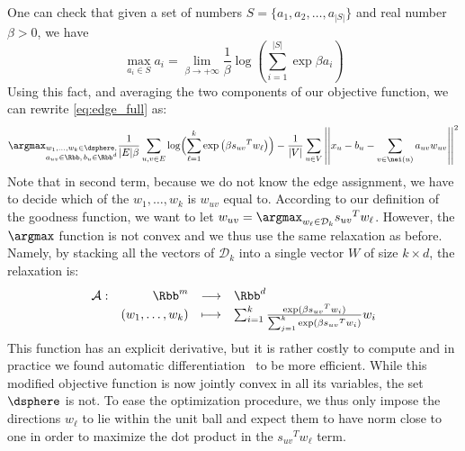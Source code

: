One can check that given a set of numbers $S=\{a_1, a_2, \ldots, a_{|S|}\}$ and real number $\beta >
0$, we have
\begin{equation*}
  \max_{a_i \in S} a_i = \lim_{\beta \rightarrow + \infty} \frac{1}{\beta}
  \log\left( \sum_{i=1}^{|S|} \exp{\beta a_i} \right)
\end{equation*}
Using this fact, and averaging the two components of our objective function, we can rewrite
\eqref{eq:edge_full} as:
\begin{equation}
  \label{eq:edge_soft}
  \argmax_{{\substack{w_1,\ldots,w_k \in \dsphere,\\
  a_{uv}\in\Rbb,\, b_u \in \Rbb^d}}}
  \frac{1}{|E|\beta} \sum_{u,v\in E}
  \log\Bigl(\sum_{\ell=1}^k\exp\left(\beta {s_{uv}}^T w_\ell \right)\Bigr)
  - \frac{1}{|V|}\sum_{u\in V}
  \left|\left| x_u - b_u - \sum_{v \in \nei(u)} a_{uv} w_{uv} \right|\right|^2
\end{equation}
Note that in second term, because we do not know the edge assignment, we have to decide which of the
$w_1, \ldots, w_k$ is $w_{uv}$ equal to. According to our definition of the goodness function, we
want to let $w_{uv} = \argmax_{w_\ell \in \mathcal{D}_k} {s_{uv}}^T w_\ell$. However, the $\argmax$
function is not convex and we thus use the same relaxation as before. Namely, by stacking all the
vectors of $\mathcal{D}_k$ into a single vector $W$ of size $k\times d$, the relaxation is:
$$ \begin{array}[t]{lrcl}
  \mathcal{A} : & \Rbb^m & \longrightarrow & \Rbb^d \\
      & (w_1,\ldots,w_k) & \longmapsto &
  \sum_{i=1}^k \frac{\exp(\beta{s_{uv}}^T w_i)}{\sum_{j=1}^k \exp(\beta {s_{uv}}^T w_i)} w_i
\end{array} $$
This function has an explicit derivative, but it is rather costly to compute and in practice we
found automatic differentiation~\autocite{autograd15} to be more efficient. While this modified
objective function is now jointly convex in all its variables, the set $\dsphere$ is not. To ease
the optimization procedure, we thus only impose the directions $w_\ell$ to lie within the unit ball
and expect them to have norm close to one in order to maximize the dot product in the ${s_{uv}}^T
w_\ell$ term.

